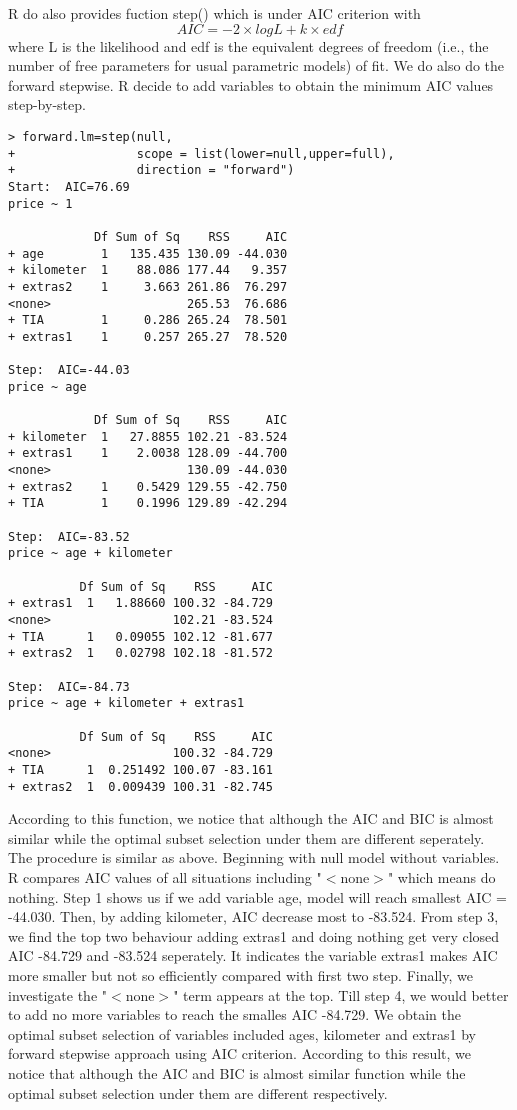 \documentclass[a4paper]{article}
\begin{document}
\noindent
R do also provides fuction step() which is under AIC criterion with \[AIC = - 2 \times log L + k \times edf\] where L is the likelihood and edf is the equivalent degrees of freedom (i.e., the number of free parameters for usual parametric models) of fit. We do also do the forward stepwise. R decide to add variables to obtain the minimum AIC values step-by-step.\\

\begin{verbatim}
> forward.lm=step(null,
+                 scope = list(lower=null,upper=full),
+                 direction = "forward")
Start:  AIC=76.69
price ~ 1

            Df Sum of Sq    RSS     AIC
+ age        1   135.435 130.09 -44.030
+ kilometer  1    88.086 177.44   9.357
+ extras2    1     3.663 261.86  76.297
<none>                   265.53  76.686
+ TIA        1     0.286 265.24  78.501
+ extras1    1     0.257 265.27  78.520

Step:  AIC=-44.03
price ~ age

            Df Sum of Sq    RSS     AIC
+ kilometer  1   27.8855 102.21 -83.524
+ extras1    1    2.0038 128.09 -44.700
<none>                   130.09 -44.030
+ extras2    1    0.5429 129.55 -42.750
+ TIA        1    0.1996 129.89 -42.294

Step:  AIC=-83.52
price ~ age + kilometer

          Df Sum of Sq    RSS     AIC
+ extras1  1   1.88660 100.32 -84.729
<none>                 102.21 -83.524
+ TIA      1   0.09055 102.12 -81.677
+ extras2  1   0.02798 102.18 -81.572

Step:  AIC=-84.73
price ~ age + kilometer + extras1

          Df Sum of Sq    RSS     AIC
<none>                 100.32 -84.729
+ TIA      1  0.251492 100.07 -83.161
+ extras2  1  0.009439 100.31 -82.745
\end{verbatim}

\noindent
According to this function, we notice that although the AIC and BIC is almost similar while the optimal subset selection under them are different seperately. The procedure is similar as above. Beginning with null model without variables. R compares AIC values of all situations including "$<$none$>$" which means do nothing. Step 1 shows us if we add variable age, model will reach smallest AIC = -44.030. Then, by adding kilometer, AIC decrease most to -83.524. From step 3, we find the top two behaviour adding extras1 and doing nothing get very closed AIC -84.729 and -83.524 seperately. It indicates the variable extras1 makes AIC more smaller but not so efficiently compared with first two step. Finally, we investigate the "$<$none$>$" term appears at the top. Till step 4, we would better to add no more variables to reach the smalles AIC -84.729. We obtain the optimal subset selection of variables included ages, kilometer and extras1 by forward stepwise approach using AIC criterion. According to this result, we notice that although the AIC and BIC is almost similar function while the optimal subset selection under them are different respectively.\\
\end{document}
